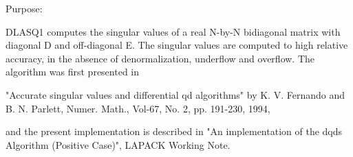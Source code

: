  \begin{DoxyParagraph}{Purpose\+: }
\begin{DoxyVerb} DLASQ1 computes the singular values of a real N-by-N bidiagonal
 matrix with diagonal D and off-diagonal E. The singular values
 are computed to high relative accuracy, in the absence of
 denormalization, underflow and overflow. The algorithm was first
 presented in

 "Accurate singular values and differential qd algorithms" by K. V.
 Fernando and B. N. Parlett, Numer. Math., Vol-67, No. 2, pp. 191-230,
 1994,

 and the present implementation is described in "An implementation of
 the dqds Algorithm (Positive Case)", LAPACK Working Note.\end{DoxyVerb}
 
\end{DoxyParagraph}

